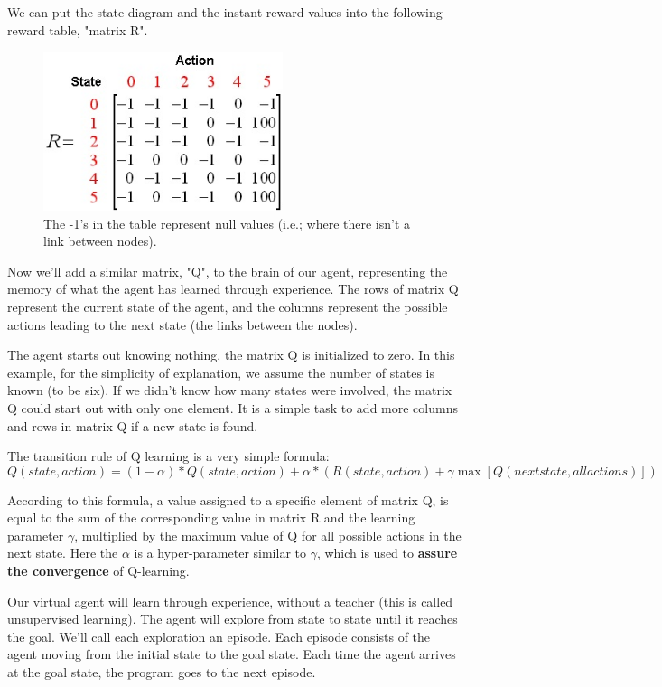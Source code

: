 \documentclass[a4paper, 11pt]{article}
\begin{document}
We can put the state diagram and the instant reward values into the following reward table, "matrix R".

\begin{figure}[ht]
\centering
\includegraphics[width=7cm]{Pic/r_matrix1}
\caption*{The -1's in the table represent null values (i.e.; where there isn't a link between nodes). }
\end{figure}

Now we'll add a similar matrix, "Q", to the brain of our agent, representing the memory of what the agent has learned through experience.  The rows of matrix Q represent the current state of the agent, and the columns represent the possible actions leading to the next state (the links between the nodes).

The agent starts out knowing nothing, the matrix Q is initialized to zero.  In this example, for the simplicity of explanation, we assume the number of states is known (to be six).  If we didn't know how many states were involved, the matrix Q could start out with only one element.  It is a simple task to add more columns and rows in matrix Q if a new state is found.

The transition rule of Q learning is a very simple formula:
$$Q(state,action)=(1-\alpha)*Q(state,action)+\alpha*(R(state,action)+\gamma\max[Q(next state,allactions)])$$

According to this formula, a value assigned to a specific element of matrix Q, is equal to the sum of the corresponding value in matrix R and the learning parameter $\gamma$, multiplied by the maximum value of Q for all possible actions in the next state. Here the $\alpha$ is a hyper-parameter similar to $\gamma$, which is used to \textbf{assure the convergence} of Q-learning.

Our virtual agent will learn through experience, without a teacher (this is called unsupervised learning).  The agent will explore from state to state until it reaches the goal. We'll call each exploration an episode.  Each episode consists of the agent moving from the initial state to the goal state.  Each time the agent arrives at the goal state, the program goes to the next episode. 
\end{document}
